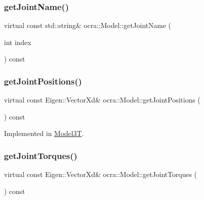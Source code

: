 \subsubsection{\texorpdfstring{get\+Joint\+Name()}{getJointName()}}
{\footnotesize\ttfamily virtual const std\+::string\& ocra\+::\+Model\+::get\+Joint\+Name (\begin{DoxyParamCaption}\item[{int}]{index }\end{DoxyParamCaption}) const\hspace{0.3cm}{\ttfamily [pure virtual]}}

\hypertarget{classocra_1_1Model_a9af46a69337d88d28232554175723018}{}\label{classocra_1_1Model_a9af46a69337d88d28232554175723018} 
\subsubsection{\texorpdfstring{get\+Joint\+Positions()}{getJointPositions()}}
{\footnotesize\ttfamily virtual const Eigen\+::\+Vector\+Xd\& ocra\+::\+Model\+::get\+Joint\+Positions (\begin{DoxyParamCaption}{ }\end{DoxyParamCaption}) const\hspace{0.3cm}{\ttfamily [pure virtual]}}



Implemented in \hyperlink{classModel3T_abcaa7a21ab72837d469e5b13db23f0bc}{Model3T}.

\hypertarget{classocra_1_1Model_a062fc08c456adf091e38ed1cfa5f0524}{}\label{classocra_1_1Model_a062fc08c456adf091e38ed1cfa5f0524} 
\subsubsection{\texorpdfstring{get\+Joint\+Torques()}{getJointTorques()}}
{\footnotesize\ttfamily virtual const Eigen\+::\+Vector\+Xd\& ocra\+::\+Model\+::get\+Joint\+Torques (\begin{DoxyParamCaption}{ }\end{DoxyParamCaption}) const\hspace{0.3cm}{\ttfamily [pure virtual]}}

